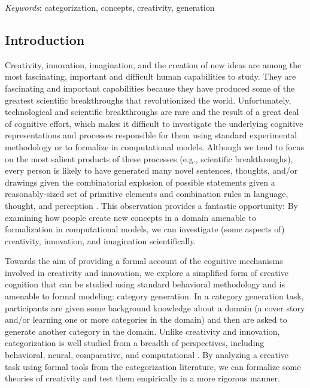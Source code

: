 \documentclass[12pt]{article}
\begin{document}
\setlength\parindent{0.5in}
{\em Keywords}: categorization, concepts, creativity, generation
\clearpage


\begin{flushleft}

\section{Introduction}
\setlength\parindent{0.5in}

Creativity, innovation, imagination, and the creation of new ideas are among the most fascinating, important and difficult human capabilities to study. They are fascinating and important capabilities because they have produced some of the greatest scientific breakthroughs that revolutionized the world. Unfortunately, technological and scientific breakthroughs are rare and the result of a great deal of cognitive effort, which makes it difficult to investigate the underlying cognitive representations and processes responsible for them using standard experimental methodology or to formalize in computational models. Although we tend to focus on the most salient products of these processes (e.g., scientific breakthroughs), every person is likely to have generated many novel sentences, thoughts, and/or drawings given the combinatorial explosion of possible statements given a reasonably-sized set of primitive elements and combination rules in language, thought, and perception \citep{goldstone2003}. This observation provides a fantastic opportunity: By examining how people create new concepts in a domain amenable to formalization in computational models, we can investigate (some aspects of) creativity, innovation, and imagination scientifically.

Towards the aim of providing a formal account of the cognitive mechanisms involved in creativity and innovation, we explore a simplified form of creative cognition that can be studied using standard behavioral methodology and is amenable to formal modeling: category generation. In a category generation task, participants are given some background knowledge about a domain (a cover story and/or learning one or more categories in the domain) and then are asked to generate another category in the domain. Unlike creativity and innovation, categorization is well studied from a breadth of perspectives, including behavioral, neural, comparative, and computational  \citep{kurtz2015human,mack2013,margolis2015,pothoswills2011}. By analyzing a creative task using formal tools from the categorization literature, we can formalize some theories of creativity and test them empirically in a more rigorous manner. 


\end{flushleft}
\end{document}
